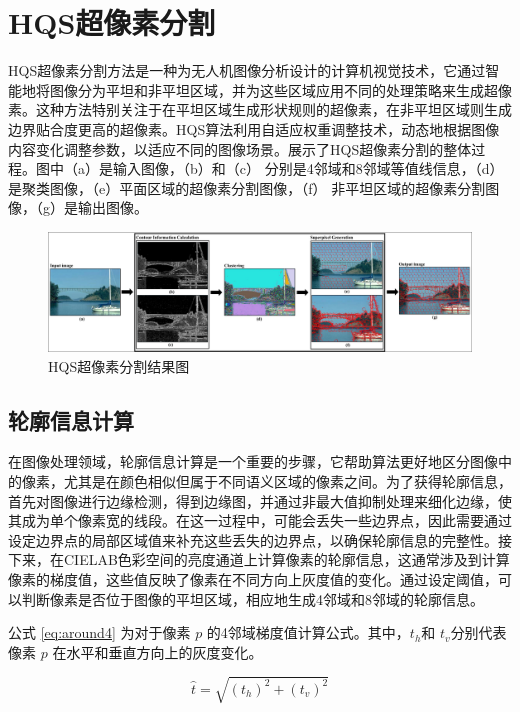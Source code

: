 \section{HQS超像素分割}

HQS超像素分割方法是一种为无人机图像分析设计的计算机视觉技术，它通过智能地将图像分为平坦和非平坦区域，并为这些区域应用不同的处理策略来生成超像素。这种方法特别关注于在平坦区域生成形状规则的超像素，在非平坦区域则生成边界贴合度更高的超像素。HQS算法利用自适应权重调整技术，动态地根据图像内容变化调整参数，以适应不同的图像场景。展示了HQS超像素分割的整体过程。图中（a）是输入图像，（b）和（c） 分别是4邻域和8邻域等值线信息，（d）是聚类图像，（e）平面区域的超像素分割图像，（f） 非平坦区域的超像素分割图像，（g）是输出图像。

\begin{figure}[htbp]
	\centering
    \includegraphics[width=1.0\textwidth]{pic/hqs.png}
	\caption{HQS超像素分割结果图}
      \label{fig:hqs_pic}
\end{figure}

\subsection{轮廓信息计算}
在图像处理领域，轮廓信息计算是一个重要的步骤，它帮助算法更好地区分图像中的像素，尤其是在颜色相似但属于不同语义区域的像素之间。为了获得轮廓信息，首先对图像进行边缘检测，得到边缘图，并通过非最大值抑制处理来细化边缘，使其成为单个像素宽的线段。在这一过程中，可能会丢失一些边界点，因此需要通过设定边界点的局部区域值来补充这些丢失的边界点，以确保轮廓信息的完整性。接下来，在CIELAB色彩空间的亮度通道上计算像素的轮廓信息，这通常涉及到计算像素的梯度值，这些值反映了像素在不同方向上灰度值的变化。通过设定阈值，可以判断像素是否位于图像的平坦区域，相应地生成4邻域和8邻域的轮廓信息。

公式 \eqref{eq:around4} 为对于像素 \(p\) 的4邻域梯度值计算公式。其中，\(t_h\)​ 和 \(t_v​\)​ 分别代表像素 \(p\) 在水平和垂直方向上的灰度变化。

\begin{equation}
  \hat{t} = \sqrt{(t_h)^2 + (t_v)^2}
  \label{eq:around4}
\end{equation}

